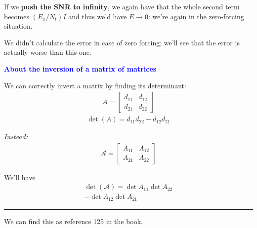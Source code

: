 \documentclass[a4paper, 12pt]{book}
\begin{document}
If we \textbf{push the SNR to infinity}, we again have that the whole second term becomes $(E_x/N_t)I$ and thus we'd have $E \to 0$: we're again in the zero-forcing situation.

\begin{tcolorbox}[colback=teal!5, colframe=teal, boxrule=0.5pt, sharp corners]
    We didn't calculate the error in case of zero forcing; we'll see that the error is actually worse than this one.
\end{tcolorbox}

\begin{tcolorbox}[colback=blue!5, colframe=blue, boxrule=0.5pt, sharp corners]
    \textbf{\textcolor{blue}{ About the inversion of a matrix of matrices}}
    \vspace{0.5em}
    
    We can correctly invert a matrix by finding its determinant:
    \begin{align}
        A = \begin{bmatrix}
            d_{11} & d_{12} \\
            d_{21} & d_{22}
        \end{bmatrix}
    \end{align}
    \begin{align}
        \det(A) = d_{11}d_{22} - d_{12}d_{21}
    \end{align}
    
    \textit{Instead:}
    \begin{align}
        \mathcal{A} = \begin{bmatrix}
            A_{11} & A_{12} \\
            A_{21} & A_{22}
        \end{bmatrix}
    \end{align}
    
    We'll have
    \begin{align}
        \det(\mathcal{A}) = \det A_{11} \det A_{22} \\
            - \det A_{12} \det A_{21}
    \end{align}
    
    \vspace{0.5em}
    \hrule
    \vspace{0.5em}
    \footnotesize We can find this as reference 125 in the book.
\end{tcolorbox}
\end{document}
